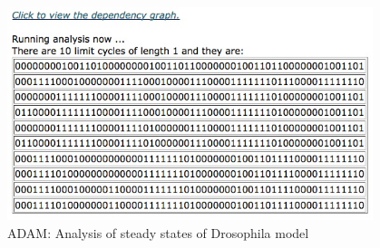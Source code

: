 \documentclass[10pt]{bmc_article}
\begin{document}
\begin{figure}[htb]
\centering
\includegraphics[width=0.95\textwidth]{DroAlgOutput.jpg}
\caption{ADAM: Analysis of steady states of Drosophila model}
\label{fig:alg}
\end{figure}
\end{document}
